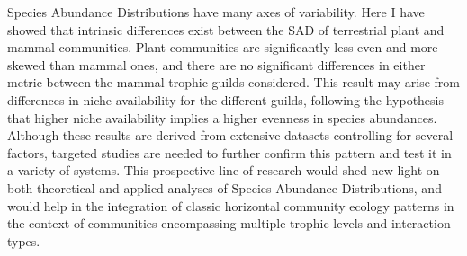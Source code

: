 Species Abundance Distributions have many axes of variability. Here I have showed that intrinsic differences exist between the SAD of terrestrial plant and mammal communities. Plant communities are significantly less even and more skewed than mammal ones, and there are no significant differences in either metric between the mammal trophic guilds considered. This result may arise from differences in niche availability for the different guilds, following the hypothesis that higher niche availability implies a higher evenness in species abundances. Although these results are derived from extensive datasets controlling for several factors, targeted studies are needed to further confirm this pattern and test it in a variety of systems. This prospective line of research would shed new light on both theoretical and applied analyses of Species Abundance Distributions, and would help in the integration of classic horizontal community ecology patterns in the context of communities encompassing multiple trophic levels and interaction types.

